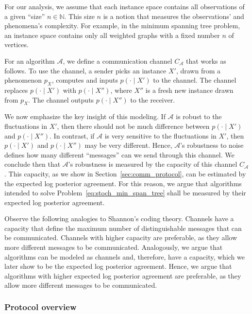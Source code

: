 For our analysis, we assume that each instance space contains all observations of a given ``size'' $n \in \mathbb{N}$. This size $n$ is a notion that measures the observations' and phenomena's complexity. For example, in the minimum spanning tree problem, an instance space contains only all weighted graphs with a fixed number $n$ of vertices.

For an algorithm $\mathcal{A}$, we define a communication channel $C_{\mathcal{A}}$ that works as follows. To use the channel, a sender picks an instance $X'$, drawn from a phenomenon $p_X$, computes and inputs $p(\cdot \mid X')$ to the channel. The channel replaces $p(\cdot \mid X')$ with $p(\cdot \mid X'')$, where $X''$ is a fresh new instance drawn from $p_X$. The channel outputs $p(\cdot \mid X'')$ to the receiver.

We now emphasize the key insight of this modeling. If $\mathcal{A}$ is robust to the fluctuations in $X'$, then there should not be much difference between $p(\cdot \mid X')$ and $p(\cdot \mid X'')$. In contrast, if $\mathcal{A}$ is very sensitive to the fluctuations in $X'$, then $p(\cdot \mid X')$ and $p(\cdot \mid X'')$ may be very different. Hence, $\mathcal{A}$'s robustness to noise defines how many different ``messages'' can we send through this channel. We conclude then that $\mathcal{A}$'s robustness is measured by the capacity of this channel $C_{\mathcal{A}}$. This capacity, as we show in Section~\ref{sec:comm_protocol}, can be estimated by the expected log posterior agreement. For this reason, we argue that algorithms intended to solve Problem~\ref{eq:stoch_min_span_tree} shall be measured by their expected log posterior agreement.

Observe the following analogies to Shannon's coding theory. Channels have a capacity that define the maximum number of distinguishable messages that can be communicated. Channels with higher capacity are preferable, as they allow more different messages to be communicated. Analogously, we argue that algorithms can be modeled as channels and, therefore, have a capacity, which we later show to be the expected log posterior agreement. Hence, we argue that algorithms with higher expected log posterior agreement are preferable, as they allow more different messages to be communicated.

\subsubsection*{Protocol overview}

